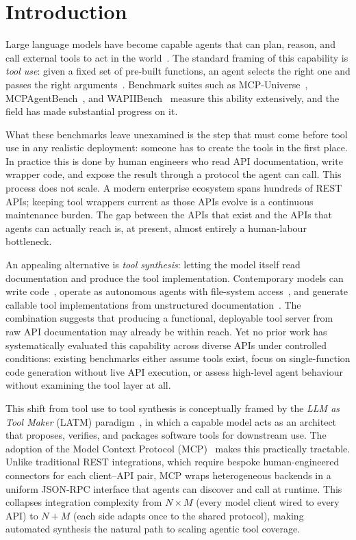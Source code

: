 \documentclass[12pt]{report}
\begin{document}
\chapter{Introduction}

Large language models have become capable agents that can plan, reason, and
call external tools to act in the world~\cite{brown2020gpt3,codeact2024}.
The standard framing of this capability is \emph{tool use}: given a fixed set
of pre-built functions, an agent selects the right one and passes the right
arguments~\cite{schick2023toolformer}. Benchmark suites such as
MCP-Universe~\cite{mcpuniverse2025}, MCPAgentBench~\cite{mcpagentbench2024},
and WAPIIBench~\cite{wapiibench2025} measure this ability extensively,
and the field has made substantial progress on it.

What these benchmarks leave unexamined is the step that must come before tool
use in any realistic deployment: someone has to create the tools in the first
place. In practice this is done by human engineers who read API documentation,
write wrapper code, and expose the result through a protocol the agent can
call. This process does not scale. A modern enterprise ecosystem spans hundreds
of REST APIs; keeping tool wrappers current as those APIs evolve is a
continuous maintenance burden. The gap between the APIs that exist and the APIs
that agents can actually reach is, at present, almost entirely a human-labour
bottleneck.

An appealing alternative is \emph{tool synthesis}: letting the model itself
read documentation and produce the tool implementation. Contemporary models can
write code~\cite{toolfactory2025}, operate as autonomous agents with file-system
access~\cite{codeact2024}, and generate callable tool implementations from
unstructured documentation~\cite{doc2agent2025}.
The combination suggests that producing a functional, deployable tool server
from raw API documentation may already be within reach. Yet no prior work has
systematically evaluated this capability across diverse APIs under controlled
conditions: existing benchmarks either assume tools exist, focus on
single-function code generation without live API execution, or assess
high-level agent behaviour without examining the tool layer at all.

This shift from tool use to tool synthesis is conceptually framed by the
\emph{LLM as Tool Maker} (LATM) paradigm~\cite{cai2023latm}, in which a
capable model acts as an architect that proposes, verifies, and packages
software tools for downstream use. The adoption of the Model Context Protocol
(MCP)~\cite{anthropic2024mcp} makes this practically tractable. Unlike
traditional REST integrations, which require bespoke human-engineered
connectors for each client--API pair, MCP wraps heterogeneous backends in a
uniform JSON-RPC interface that agents can discover and call at runtime. This
collapses integration complexity from $N \times M$ (every model client wired
to every API) to $N + M$ (each side adapts once to the shared protocol),
making automated synthesis the natural path to scaling agentic tool coverage.
\end{document}
